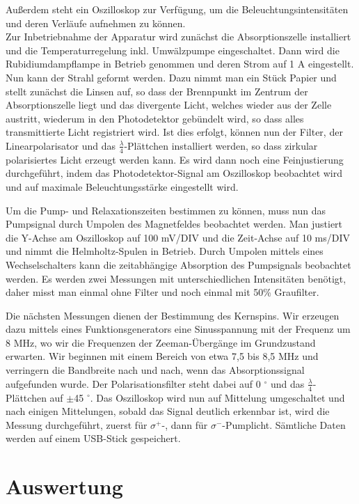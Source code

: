 \documentclass[bigchapter,colorback,accentcolor=tud4b,linedtoc,11pt]{tudreport}
\begin{document}
Außerdem steht ein Oszilloskop zur Verfügung, um die Beleuchtungsintensitäten und deren Verläufe aufnehmen zu können.
\\

Zur Inbetriebnahme der Apparatur wird zunächst die Absorptionszelle installiert und die Temperaturregelung inkl. Umwälzpumpe eingeschaltet. Dann wird die Rubidiumdampflampe in Betrieb genommen und deren Strom auf 1 A eingestellt. Nun kann der Strahl geformt werden. Dazu nimmt man ein Stück Papier und stellt zunächst die Linsen auf, so dass der Brennpunkt im Zentrum der Absorptionszelle liegt und das divergente Licht, welches wieder aus der Zelle austritt, wiederum in den Photodetektor gebündelt wird, so dass alles transmittierte Licht registriert wird. Ist dies erfolgt, können nun der Filter, der Linearpolarisator und das $\frac{\lambda}{4}$-Plättchen installiert werden, so dass zirkular polarisiertes Licht erzeugt werden kann. Es wird dann noch eine Feinjustierung durchgeführt, indem das Photodetektor-Signal am Oszilloskop beobachtet wird und auf maximale Beleuchtungsstärke eingestellt wird.

Um die Pump- und Relaxationszeiten bestimmen zu können, muss nun das Pumpsignal durch Umpolen des Magnetfeldes beobachtet werden. Man justiert die Y-Achse am Oszilloskop auf 100 mV/DIV und die Zeit-Achse auf 10 ms/DIV und nimmt die Helmholtz-Spulen in Betrieb. Durch Umpolen mittels eines Wechselschalters kann die zeitabhängige Absorption des Pumpsignals beobachtet werden. Es werden zwei Messungen mit unterschiedlichen Intensitäten benötigt, daher misst man einmal ohne Filter und noch einmal mit 50\% Graufilter. 

Die nächsten Messungen dienen der Bestimmung des Kernspins. Wir erzeugen dazu mittels eines Funktionsgenerators eine Sinusspannung mit der Frequenz um 8 MHz, wo wir die Frequenzen der Zeeman-Übergänge im Grundzustand erwarten. Wir beginnen mit einem Bereich von etwa 7,5 bis 8,5 MHz und verringern die Bandbreite nach und nach, wenn das Absorptionssignal aufgefunden wurde. Der Polarisationsfilter steht dabei auf 0 $^{\circ}$ und das $\frac{\lambda}{4}$-Plättchen auf $\pm$45 $^{\circ}$. Das Oszilloskop wird nun auf Mittelung umgeschaltet und nach einigen Mittelungen, sobald das Signal deutlich erkennbar ist, wird die Messung durchgeführt, zuerst für $\sigma^+$-, dann für $\sigma^-$-Pumplicht. Sämtliche Daten werden auf einem USB-Stick gespeichert.

\chapter{Auswertung}
\end{document}
